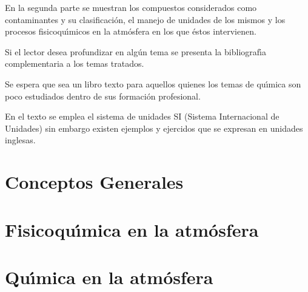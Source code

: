 \documentclass[spanish]{WileySix}
\begin{document}
\begin{preface}
 En la segunda parte se muestran los compuestos considerados como contaminantes y su clasificaci\'on, el manejo de unidades de los mismos y los procesos fisicoqu\'{\i}micos  en la atm\'osfera en los que \'estos intervienen.
 
 Si el lector desea profundizar en  alg\'un tema se presenta la bibliograf\'{\i}a complementaria a los temas tratados.
 
 Se espera que sea un libro texto para aquellos quienes los temas de qu\'{\i}mica son poco estudiados dentro de sus formaci\'on profesional.
 

En el texto se emplea el sistema de unidades SI (Sistema Internacional de Unidades)  sin embargo existen ejemplos y ejercidos que se expresan en unidades inglesas.
 \end{preface}
\renewcommand{\tablename}{Cuadro}

%
   \part{Conceptos Generales}
   \linenumbers




\part{Fisicoqu\'{\i}mica en la atm\'osfera}
  
   
    
\part{Qu\'{\i}mica en la atm\'osfera}
   
   
   \nolinenumbers

   
    \nocite{boyle1692general} \nocite{burton}\nocite{castellan}\nocite{Hein} 
    \nocite{maron}\nocite{reed2016acid}\nocite{wingrove}
%
\end{document}
